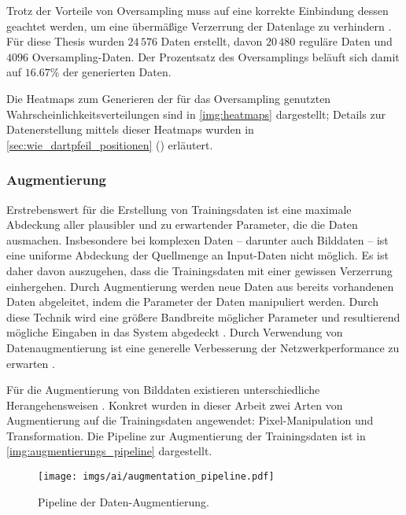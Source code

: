 Trotz der Vorteile von Oversampling muss auf eine korrekte Einbindung dessen geachtet werden, um eine übermäßige Verzerrung der Datenlage zu verhindern \cite{oversampling_bad}. Für diese Thesis wurden $24\,576$ Daten erstellt, davon $20\,480$ reguläre Daten und $4096$ Oversampling-Daten. Der Prozentsatz des Oversamplings beläuft sich damit auf $16.67\%$ der generierten Daten.

Die Heatmaps zum Generieren der für das Oversampling genutzten Wahrscheinlichkeitsverteilungen sind in \autoref{img:heatmaps} dargestellt; Details zur Datenerstellung mittels dieser Heatmaps wurden in \autoref{sec:wie_dartpfeil_positionen} () erläutert.


\subsubsection{Augmentierung}
\label{sec:daten_augmentierung}

Erstrebenswert für die Erstellung von Trainingsdaten ist eine maximale Abdeckung aller plausibler und zu erwartender Parameter, die die Daten ausmachen. Insbesondere bei komplexen Daten -- darunter auch Bilddaten -- ist eine uniforme Abdeckung der Quellmenge an Input-Daten nicht möglich. Es ist daher davon auszugehen, dass die Trainingsdaten mit einer gewissen Verzerrung einhergehen. Durch Augmentierung werden neue Daten aus bereits vorhandenen Daten abgeleitet, indem die Parameter der Daten manipuliert werden. Durch diese Technik wird eine größere Bandbreite möglicher Parameter und resultierend mögliche Eingaben in das System abgedeckt \cite{augmentierung, augmentation_max_likelihood_est}. Durch Verwendung von Datenaugmentierung ist eine generelle Verbesserung der Netzwerkperformance zu erwarten \cite{augmentierung_auswirking}.

Für die Augmentierung von Bilddaten existieren unterschiedliche Herangehensweisen \cite{augmentierung_techniken}. Konkret wurden in dieser Arbeit zwei Arten von Augmentierung auf die Trainingsdaten angewendet: Pixel-Manipulation und Transformation. Die Pipeline zur Augmentierung der Trainingsdaten ist in \autoref{img:augmentierungs_pipeline} dargestellt.

\begin{figure}
    \centering
    \texttt{[image: imgs/ai/augmentation\_pipeline.pdf]}
    \caption{Pipeline der Daten-Augmentierung.}
    \label{img:augmentierungs_pipeline}
\end{figure}

